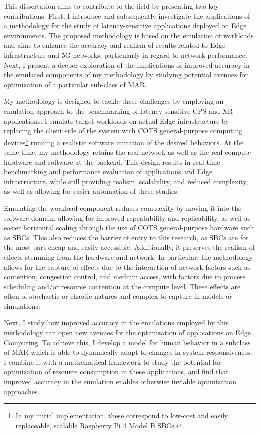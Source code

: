 This dissertation aims to contribute to the field by presenting two key contributions.
First, I introduce and subsequently investigate the applications of a methodology for the study of latency-sensitive applications deployed on Edge environments.
The proposed methodology is based on the emulation of workloads and aims to enhance the accuracy and realism of results related to Edge infrastructure and 5G networks, particularly in regard to network performance.
Next, I present a deeper exploration of the implications of improved accuracy in the emulated components of my methodology by studying potential avenues for optimization of a particular sub-class of \gls{MAR}.

My methodology is designed to tackle these challenges by employing an emulation approach to the benchmarking of latency-sensitive \gls{CPS} and \gls{XR} applications. 
I emulate target workloads on actual Edge infrastructure by replacing the client side of the system with \gls{COTS} general-purpose computing devices\footnote{%
    In my initial implementation, these correspond to low-cost and easily replaceable, scalable Raspberry Pi 4 Model B \acsp{SBC}.
} running a realistic software imitation of the desired behaviors.
At the same time, my methodology retains the real network as well as the real compute hardware and software at the backend.
This design results in real-time benchmarking and performance evaluation of applications and Edge infrastructure, while still providing realism, scalability, and reduced complexity, as well as allowing for easier automation of these studies.

Emulating the workload component reduces complexity by moving it into the software domain, allowing for improved repeatability and replicability, as well as easier horizontal scaling through the use of \gls{COTS} general-purpose hardware such as \glspl{SBC}.
This also reduces the barrier of entry to this research, as \glspl{SBC} are for the most part cheap and easily accessible.
Additionally, it preserves the realism of effects stemming from the hardware and network.
In particular, the methodology allows for the capture of effects due to the interaction of network factors such as contention, congestion control, and medium access, with factors due to process scheduling and/or resource contention at the compute level.
These effects are often of stochastic or chaotic natures and complex to capture in models or simulations.

Next, I study how improved accuracy in the emulations employed by this methodology can open new avenues for the optimization of applications on Edge Computing.
To achieve this, I develop a model for human behavior in a subclass of \gls{MAR} which is able to dynamically adapt to changes in system responsiveness.
I combine it with a mathematical framework to study the potential for optimization of resource consumption in these applications, and find that improved accuracy in the emulation enables otherwise inviable optimization approaches.

